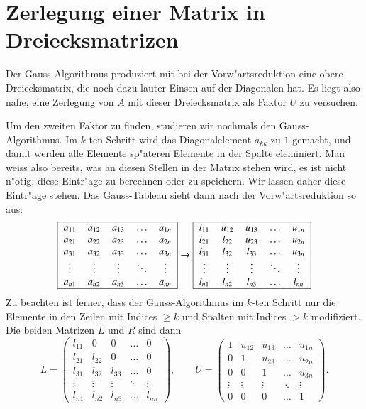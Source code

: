 \section{Zerlegung einer Matrix in Dreiecksmatrizen}
Der Gauss-Algorithmus produziert mit bei der Vorw"artsreduktion eine
obere Dreiecksmatrix, die noch dazu lauter Einsen auf der Diagonalen
hat. Es liegt also nahe, eine Zerlegung von $A$ mit dieser Dreiecksmatrix
als Faktor $U$ zu versuchen.

Um den zweiten Faktor zu finden, studieren wir nochmals den
Gauss-Algorithmus. Im $k$-ten Schritt wird das Diagonalelement
$a_{kk}$ zu $1$ gemacht, und damit werden alle Elemente sp"ateren
Elemente in der Spalte eleminiert. Man weiss also bereits, was an
diesen Stellen in der Matrix stehen wird, es ist nicht n"otig, diese
Eintr"age zu berechnen oder zu speichern. Wir lassen daher diese
Eintr"age stehen. Das Gauss-Tableau sieht dann nach der Vorw"artsreduktion
so aus:
\[
\begin{tabular}{|>{$}c<{$}>{$}c<{$}>{$}c<{$}>{$}c<{$}>{$}c<{$}|}
\hline
a_{11}&a_{12}&a_{13}&\dots &a_{1n}\\
a_{21}&a_{22}&a_{23}&\dots &a_{2n}\\
a_{31}&a_{32}&a_{33}&\dots &a_{3n}\\
\vdots&\vdots&\vdots&\ddots&\vdots\\
a_{n1}&a_{n2}&a_{n3}&\dots &a_{nn}\\
\hline
\end{tabular}
\rightarrow
\begin{tabular}{|>{$}c<{$}>{$}c<{$}>{$}c<{$}>{$}c<{$}>{$}c<{$}|}
\hline
l_{11}&u_{12}&u_{13}&\dots &u_{1n}\\
l_{21}&l_{22}&u_{23}&\dots &u_{2n}\\
l_{31}&l_{32}&l_{33}&\dots &u_{3n}\\
\vdots&\vdots&\vdots&\ddots&\vdots\\
l_{n1}&l_{n2}&l_{n3}&\dots &l_{nn}\\
\hline
\end{tabular}
\]
Zu beachten ist ferner, dass der Gauss-Algorithmus im $k$-ten Schritt nur 
die Elemente in den Zeilen mit Indices $\ge k$ und Spalten mit Indices $>k$ 
modifiziert.
Die beiden Matrizen $L$ und $R$ sind dann
\[
L=\begin{pmatrix}
l_{11}&0     &0     &\dots &0\\
l_{21}&l_{22}&0     &\dots &0\\
l_{31}&l_{32}&l_{33}&\dots &0\\
\vdots&\vdots&\vdots&\ddots&\vdots\\
l_{n1}&l_{n2}&l_{n3}&\dots &l_{nn}
\end{pmatrix},
\qquad
U=
\begin{pmatrix}
1     &u_{12}&u_{13}&\dots &u_{1n}\\
0     &1     &u_{23}&\dots &u_{2n}\\
0     &0     &1     &\dots &u_{3n}\\
\vdots&\vdots&\vdots&\ddots&\vdots\\
0     &0     &0     &\dots &1
\end{pmatrix}.
\]
